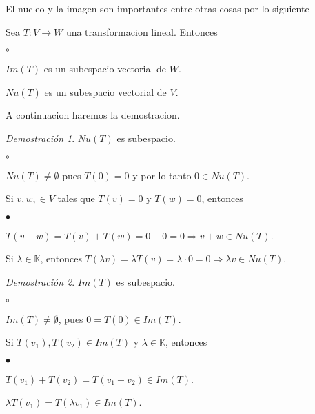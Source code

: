 \documentclass{article}
\theoremstyle{definition}
\theoremstyle{definition}
\theoremstyle{remark}
\newtheorem*{demo}{Demostración}
\begin{document}
El nucleo y la imagen son importantes entre otras cosas por lo siguiente \begin{teo}
 Sea $T : V \to W$ una transformacion lineal. Entonces \begin{list}{$\circ$}{}  
\item  $Im(T)$ es un subespacio vectorial de $W$.
\item $Nu(T)$ es un subespacio vectorial de $V$.
\end{list}
\end{teo}
A continuacion haremos la demostracion. 
\begin{demo}
  $Nu(T)$ es subespacio.
\begin{list}{$\circ$}{}  
\item $Nu(T)\neq \emptyset$ pues $T(0)=0$ y por lo tanto $ 0 \in Nu(T)$. 
\item Si $v,w, \in V$ tales que $T(v)=0$ y $T(w)=0$, entonces \begin{list}{$\bullet$}{}  
\item  $T(v+w)=T(v)+T(w)=0+0=0 \Rightarrow v+w \in Nu(T)$.
\item Si $\lambda \in \mathbb{K}$, entonces $T(\lambda v)=\lambda T(v)=\lambda \cdot 0 = 0 \Rightarrow \lambda v \in Nu(T)$.
\end{list}
\end{list}

\end{demo}
\begin{demo}$Im(T)$ es subespacio. 
\begin{list}{$\circ$}{}  
\item $Im(T)\neq \emptyset$, pues $0 = T(0) \in Im(T)$. 
\item Si $T(v_1), T(v_2) \in Im(T)$ y $\lambda \in \mathbb{K}$, entonces \begin{list}{$\bullet$}{}  
\item $T(v_1)+T(v_2)=T(v_1+v_2) \in Im(T)$.
\item $\lambda T(v_1)=T(\lambda v_1 ) \in Im(T)$.
\end{list}
\end{list}
\end{demo}
\pagebreak
\end{document}
